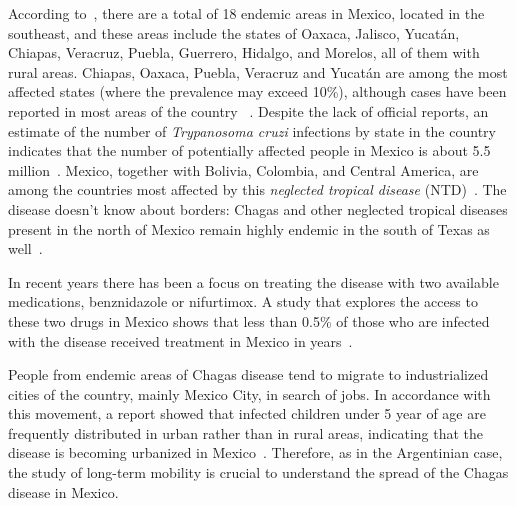 According to~\textcite{dumonteil1999update},
there are a total of 18 endemic areas in Mexico, located in the southeast, and
these areas include the states of Oaxaca, Jalisco, Yucatán, Chiapas, Veracruz,
Puebla, Guerrero, Hidalgo, and Morelos, all of them with rural areas.
Chiapas, Oaxaca, Puebla, Veracruz and Yucatán are among the most affected states (where the prevalence may exceed 10\%), although cases have been reported in most areas of the country
~\textcite{cruz2006chagmex,dumonteil1999update}.
Despite the lack of official reports, an estimate of the number of \textit{Trypanosoma cruzi} infections by state in the country
indicates that the number of potentially
affected people in Mexico is about 5.5 million~\textcite{carabarin2013chagas}.
Mexico, together with Bolivia, Colombia, and Central
America, are among the countries most affected by this
\textit{neglected tropical disease} (NTD)~\textcite{hotez2013innovation}.
The disease doesn't know about borders:
Chagas and other neglected tropical diseases present in the north of Mexico remain highly endemic in the south of Texas as well~\textcite{hotez2012texas}.

In recent years there has been a focus on treating the disease with two available
medications, benznidazole or nifurtimox. A study
that explores the access to these two drugs in Mexico
shows that less than 0.5\% of those who are infected with
the disease received treatment in Mexico in years~\textcite{manne2013barriers}.


People from endemic areas of Chagas disease tend to migrate to industrialized cities of the country, mainly Mexico City, in search of jobs.
In accordance with this movement, a report showed
that infected children under 5 year of age are frequently distributed in urban
rather than in rural areas, indicating that the disease is becoming urbanized in
Mexico~\textcite{guzman2001epidemiology}.
Therefore, as in the Argentinian case, the study of long-term mobility is crucial to understand the spread of the Chagas disease in Mexico.







